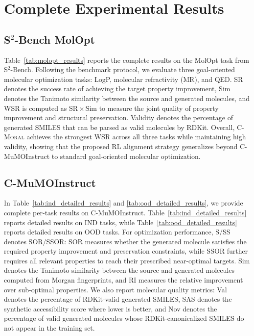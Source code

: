\documentclass[11pt]{article}
\begin{document}
\clearpage


\clearpage
\section{Complete Experimental Results}
\label{appendix:complete_exp_results}
\subsection{S$^2$-Bench MolOpt}
Table~\ref{tab:molopt_results} reports the complete results on the MolOpt task from S$^2$-Bench. 
Following the benchmark protocol, we evaluate three goal-oriented molecular optimization tasks: LogP, molecular refractivity (MR), and QED. 
SR denotes the success rate of achieving the target property improvement, Sim denotes the Tanimoto similarity between the source and generated molecules, and WSR is computed as $\mathrm{SR} \times \mathrm{Sim}$ to measure the joint quality of property improvement and structural preservation. 
Validity denotes the percentage of generated SMILES that can be parsed as valid molecules by RDKit. 
Overall, \textsc{C-Moral} achieves the strongest WSR across all three tasks while maintaining high validity, showing that the proposed RL alignment strategy generalizes beyond C-MuMOInstruct to standard goal-oriented molecular optimization.


\subsection{C-MuMOInstruct}
\label{appendix:c-mumo_results}
In Table~\ref{tab:ind_detailed_results} and \ref{tab:ood_detailed_results}, we provide complete per-task results on C-MuMOInstruct. 
Table~\ref{tab:ind_detailed_results} reports detailed results on IND tasks, while Table~\ref{tab:ood_detailed_results} reports detailed results on OOD tasks. 
For optimization performance, S/SS denotes SOR/SSOR: SOR measures whether the generated molecule satisfies the required property improvement and preservation constraints, while SSOR further requires all relevant properties to reach their prescribed near-optimal targets.
Sim denotes the Tanimoto similarity between the source and generated molecules computed from Morgan fingerprints, and RI measures the relative improvement over sub-optimal properties. 
We also report molecular quality metrics: Val denotes the percentage of RDKit-valid generated SMILES, SAS denotes the synthetic accessibility score where lower is better, and Nov denotes the percentage of valid generated molecules whose RDKit-canonicalized SMILES do not appear in the training set.
\end{document}
